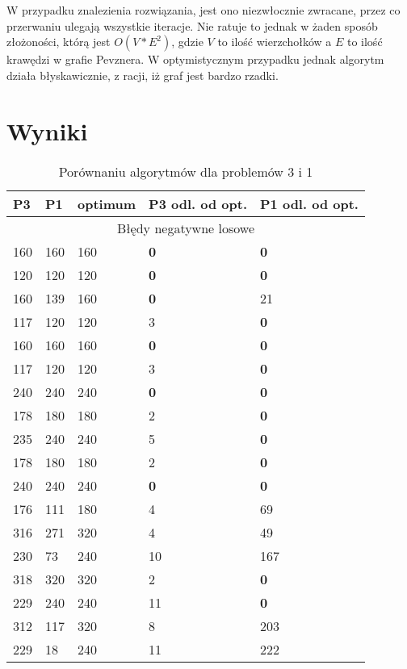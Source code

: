 \documentclass[a4paper]{article}
\begin{document}
W przypadku znalezienia rozwiązania, jest ono niezwłocznie zwracane, przez co przerwaniu ulegają wszystkie iteracje.
Nie ratuje to jednak w żaden sposób złożoności, którą jest $O(V*E^2)$, gdzie $V$ to ilość wierzchołków a $E$ to ilość
krawędzi w grafie Pevznera. W optymistycznym przypadku jednak algorytm działa błyskawicznie, z racji, iż graf jest
bardzo rzadki.

\section{Wyniki}


\begin{table}[H]
\caption{Porównaniu algorytmów dla problemów 3 i 1}
\begin{tabular}{|p{2cm}|p{2cm}|p{2cm}|p{2cm}|p{2cm}|}
\hline
\multicolumn{1}{|l|}{P3} & \multicolumn{1}{l|}{P1} &
\multicolumn{1}{l|}{optimum} & \multicolumn{1}{l|}{P3 odl. od opt.} &
\multicolumn{1}{l|}{P1 odl. od opt.} \\ \hline
\multicolumn{5}{|c|}{Błędy negatywne losowe} \\ \hline
160 & 160 & 160 & \textbf{0} & \textbf{0} \\ \hline
120 & 120 & 120 & \textbf{0} & \textbf{0} \\ \hline
160 & 139 & 160 & \textbf{0} & 21 \\ \hline
117 & 120 & 120 & 3 & \textbf{0} \\ \hline
160 & 160 & 160 & \textbf{0} & \textbf{0} \\ \hline
117 & 120 & 120 & 3 & \textbf{0} \\ \hline
240 & 240 & 240 & \textbf{0} & \textbf{0} \\ \hline
178 & 180 & 180 & 2 & \textbf{0} \\ \hline
235 & 240 & 240 & 5 & \textbf{0} \\ \hline
178 & 180 & 180 & 2 & \textbf{0} \\ \hline
240 & 240 & 240 & \textbf{0} & \textbf{0} \\ \hline
176 & 111 & 180 & 4 & 69 \\ \hline
316 & 271 & 320 & 4 & 49 \\ \hline
230 & 73 & 240 & 10 & 167 \\ \hline
318 & 320 & 320 & 2 & \textbf{0} \\ \hline
229 & 240 & 240 & 11 & \textbf{0} \\ \hline
312 & 117 & 320 & 8 & 203 \\ \hline
229 & 18 & 240 & 11 & 222 \\ \hline

\end{tabular}
\end{table}
\end{document}
